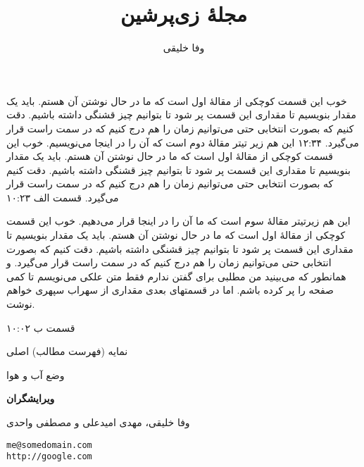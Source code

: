 \documentclass[12pt,twoside]{xepersian-magazine}
\title{مجلهٔ زی‌پرشین}
\author{وفا خلیقی}
\begin{document}
\begin{frontpage}
{خوب این قسمت کوچکی از مقالهٔ اول است که ما در حال نوشتن آن هستم. باید یک مقدار بنویسیم تا مقداری این قسمت پر شود تا بتوانیم چیز قشنگی داشته باشیم. دقت کنیم که بصورت انتخابی حتی می‌توانیم زمان را هم درج کنیم که در سمت راست قرار می‌گیرد.}%
{۱۲:۳۴}
%
{این هم زیر تیتر مقالهٔ دوم است که آن را در اینجا می‌نویسیم.}%
{خوب این قسمت کوچکی از مقالهٔ اول است که ما در حال نوشتن آن هستم. باید یک مقدار بنویسیم تا مقداری این قسمت پر شود تا بتوانیم چیز قشنگی داشته باشیم. دقت کنیم که بصورت انتخابی حتی می‌توانیم زمان را هم درج کنیم که در سمت راست قرار می‌گیرد.}%
{قسمت الف}%
{۱۰:۲۳}

%
{این هم زیرتیتر مقالهٔ سوم است که ما آن را در اینجا قرار می‌دهیم.}%
{خوب این قسمت کوچکی از مقالهٔ اول است که ما در حال نوشتن آن هستم. باید یک مقدار بنویسیم تا مقداری این قسمت پر شود تا بتوانیم چیز قشنگی داشته باشیم. دقت کنیم که بصورت انتخابی حتی می‌توانیم زمان را هم درج کنیم که در سمت راست قرار می‌گیرد. و همانطور که می‌بینید من مطلبی برای گفتن ندارم فقط متن علکی می‌نویسم تا کمی صفحه را پر کرده باشم. اما در قسمتهای بعدی مقداری از سهراب سپهری خواهم نوشت.}%

{قسمت ب}%
{۱۰:۰۲}

\begin{indexblock}{نمایه (فهرست مطالب) اصلی}



\end{indexblock}

\begin{weatherblock}{وضع آب و هوا}
\end{weatherblock}

\begin{authorblock}
\textbf{ویرایشگران}

وفا خلیقی، مهدی امیدعلی و مصطفی واحدی

\texttt{me@somedomain.com\\[5pt]
http://google.com}\\
\end{authorblock}
\end{frontpage}
\end{document}
